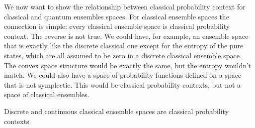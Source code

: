 We now want to show the relationship between classical probability context for classical and quantum ensembles spaces. For classical ensemble spaces the connection is simple: every classical ensemble space is classical probability context. The reverse is not true. We could have, for example, an ensemble space that is exactly like the discrete classical one except for the entropy of the pure states, which are all assumed to be zero in a discrete classical ensemble space. The convex space structure would be exactly the same, but the entropy wouldn't match. We could also have a space of probability functions defined on a space that is not symplectic. This would be classical probability contexts, but not a space of classical ensembles.

\begin{conj}
	Discrete and continuous classical ensemble spaces are classical probability contexts.
\end{conj}

	

